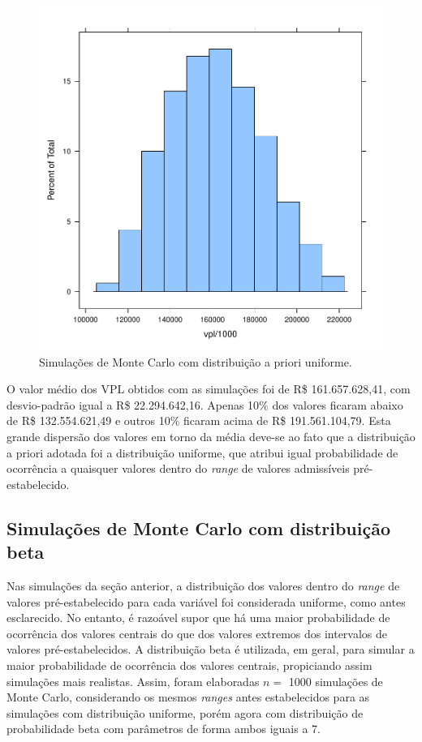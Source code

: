 \documentclass[
  10pt,
  a4paper]{article}
\begin{document}
\begin{figure}[H]

{\centering \includegraphics[width=0.6\linewidth]{images/unifMC-1} 

}

\caption{Simulações de Monte Carlo com distribuição a priori uniforme.}\label{fig:unifMC}
\end{figure}

O valor médio dos VPL obtidos com as simulações foi de R\$
161.657.628,41, com desvio-padrão igual a R\$ 22.294.642,16. Apenas 10\%
dos valores ficaram abaixo de R\$ 132.554.621,49 e outros 10\% ficaram
acima de R\$ 191.561.104,79. Esta grande dispersão dos valores em torno
da média deve-se ao fato que a distribuição a priori adotada foi a
distribuição uniforme, que atribui igual probabilidade de ocorrência a
quaisquer valores dentro do \emph{range} de valores admissíveis
pré-estabelecido.

\subsection*{Simulações de Monte Carlo com distribuição
beta}\label{simulauxe7uxf5es-de-monte-carlo-com-distribuiuxe7uxe3o-beta}

Nas simulações da seção anterior, a distribuição dos valores dentro do
\emph{range} de valores pré-estabelecido para cada variável foi
considerada uniforme, como antes esclarecido. No entanto, é razoável
supor que há uma maior probabilidade de ocorrência dos valores centrais
do que dos valores extremos dos intervalos de valores pré-estabelecidos.
A distribuição beta é utilizada, em geral, para simular a maior
probabilidade de ocorrência dos valores centrais, propiciando assim
simulações mais realistas. Assim, foram elaboradas \(n =\) 1000
simulações de Monte Carlo, considerando os mesmos \emph{ranges} antes
estabelecidos para as simulações com distribuição uniforme, porém agora
com distribuição de probabilidade beta com parâmetros de forma ambos
iguais a 7.
\end{document}
